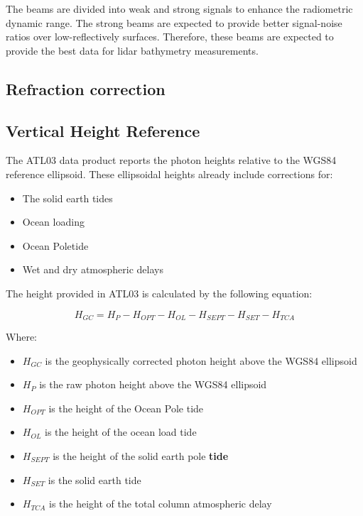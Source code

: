 The beams are divided into weak and strong signals to enhance the radiometric dynamic range. The strong beams are expected to provide better signal-noise ratios over low-reflectively surfaces.\parencite{Neumann2019d} Therefore, these beams are expected to provide the best data for lidar bathymetry measurements.

\subsection{Refraction correction}


\subsection{Vertical Height Reference}
The ATL03 data product reports the photon heights relative to the WGS84 reference ellipsoid. These ellipsoidal heights already include corrections for:

\begin{itemize}
      \item The solid earth tides 
      \item Ocean loading 
      \item Ocean Poletide 
      \item Wet and dry atmospheric delays
\end{itemize}
 
The height provided in ATL03 is calculated by the following equation:

\[H_{GC} =  H_{P} - H_{OPT} - H_{OL} - H_{SEPT} - H_{SET} - H_{TCA}\]

Where:

\begin{itemize}

      \item \(H_{GC}\) is the geophysically corrected photon height above the WGS84 ellipsoid
      \item \(H_{P}\) is the raw photon height above the WGS84 ellipsoid
      \item \(H_{OPT}\) is the height of the Ocean Pole tide
      \item \(H_{OL}\) is the height of the ocean load tide
      \item \(H_{SEPT}\) is the height of the solid earth pole \textbf{tide}
      \item \(H_{SET}\) is the solid earth tide
      \item \(H_{TCA}\) is the height of the total column atmospheric delay
\end{itemize}

